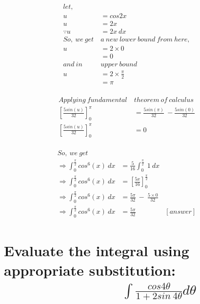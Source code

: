 \documentclass[12pt]{article}%
\begin{document}
\pagebreak

\begin{align*}
    let,\\
    u &= cos 2x \\
    u &= 2x \\
    \because u &= 2x \: dx \\
    So,\: we \: get \: &a \: new \: lower \: bound \: from \: here, \\
    u &=2 \times 0 \\
      &= 0\\
      and \: in \: &upper \: bound \\
      u &= 2 \times \frac{\pi}{2} \\
        &= \pi \\ 
\end{align*}

\begin{align*}
    Applying \ fundamental \ &theorem \ of \ calculus\\
    \left[\frac{5sin(u)}{32} \right]_{0}^{\pi} &= \frac{5sin(\pi)}{32} \: - \frac{5sin(0)}{32}\\
    \left[\frac{5sin(u)}{32} \right]_{0}^{\pi} &=0\\
\end{align*}

\begin{align*}
    So, \ we \ get \ \ \ \ \ \ &\\
    \Rightarrow \int_{0}^{\frac{\pi}{2}} cos^{6}(x) \: dx &= \frac{5}{16} \int_{0}^{\frac{\pi}{2}} \: 1 \: dx \\
    \Rightarrow \int_{0}^{\frac{\pi}{2}} cos^{6}(x) \: dx &= \left[ \frac{5x}{16}\right]_{0}^{\frac{\pi}{2}} \\
    \Rightarrow \int_{0}^{\frac{\pi}{2}} cos^{6}(x) \: dx &= \frac{5 \pi}{32} \: - \: \frac{5\times0}{32}\\
    \Rightarrow \int_{0}^{\frac{\pi}{2}} cos^{6}(x) \: dx &= \frac{5\pi}{32}  &  [answer]\\
\end{align*}

\pagebreak

\section{Evaluate the integral using appropriate substitution: \\ \ \ \ \ \ \ \ \ \ \ \ \ \ \ \ $\int \frac{cos4\theta}{1+2sin\:4\theta} d\theta$}
\end{document}
